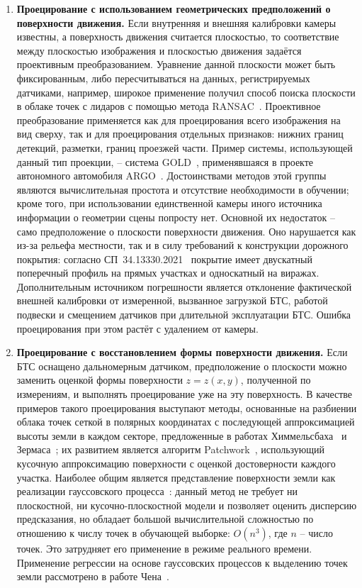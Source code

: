 \begin{enumerate}
    \item \textbf{Проецирование с использованием геометрических предположений о поверхности движения.} Если внутренняя и внешняя калибровки камеры известны, а поверхность движения считается плоскостью, то соответствие между плоскостью изображения и плоскостью движения задаётся проективным преобразованием. Уравнение данной плоскости может быть фиксированным, либо пересчитываться на данных, регистрируемых датчиками, например, широкое применение получил способ поиска плоскости в облаке точек с лидаров с помощью метода RANSAC~\cite{fischler1981}. Проективное преобразование применяется как для проецирования всего изображения на вид сверху, так и для проецирования отдельных признаков: нижних границ детекций, разметки, границ проезжей части. Пример системы, использующей данный тип проекции, -- система GOLD~\cite{bertozzi1998gold}, применявшаяся в проекте автономного автомобиля ARGO~\cite{bertozzi1998experience}. Достоинствами методов этой группы являются вычислительная простота и отсутствие необходимости в обучении; кроме того, при использовании единственной камеры иного источника информации о геометрии сцены попросту нет. Основной их недостаток -- само предположение о плоскости поверхности движения. Оно нарушается как из-за рельефа местности, так и в силу требований к конструкции дорожного покрытия: согласно СП~34.13330.2021~\cite{sp34_2021} покрытие имеет двускатный поперечный профиль на прямых участках и односкатный на виражах. Дополнительным источником погрешности является отклонение фактической внешней калибровки от измеренной, вызванное загрузкой БТС, работой подвески и смещением датчиков при длительной эксплуатации БТС. Ошибка проецирования при этом растёт с удалением от камеры.
    \item \textbf{Проецирование с восстановлением формы поверхности движения.} Если БТС оснащено дальномерным датчиком, предположение о плоскости можно заменить оценкой формы поверхности $z = z(x, y)$, полученной по измерениям, и выполнять проецирование уже на эту поверхность. В качестве примеров такого проецирования выступают методы, основанные на разбиении облака точек сеткой в полярных координатах с последующей аппроксимацией высоты земли в каждом секторе, предложенные в работах Химмельсбаха~\cite{himmelsbach2010fast} и Зермаса~\cite{zermas2017fast}; их развитием является алгоритм Patchwork~\cite{lim2021patchwork}, использующий кусочную аппроксимацию поверхности с оценкой достоверности каждого участка. Наиболее общим является представление поверхности земли как реализации гауссовского процесса~\cite{rasmussen2003gaussian}: данный метод не требует ни плоскостной, ни кусочно-плоскостной модели и позволяет оценить дисперсию предсказания, но обладает большой вычислительной сложностью по отношению к числу точек в обучающей выборке: $O(n^3)$, где $n$ -- число точек. Это затрудняет его применение в режиме реального времени. Применение регрессии на основе гауссовских процессов к выделению точек земли рассмотрено в работе Чена~\cite{chen2014gaussian}.

\end{enumerate}
